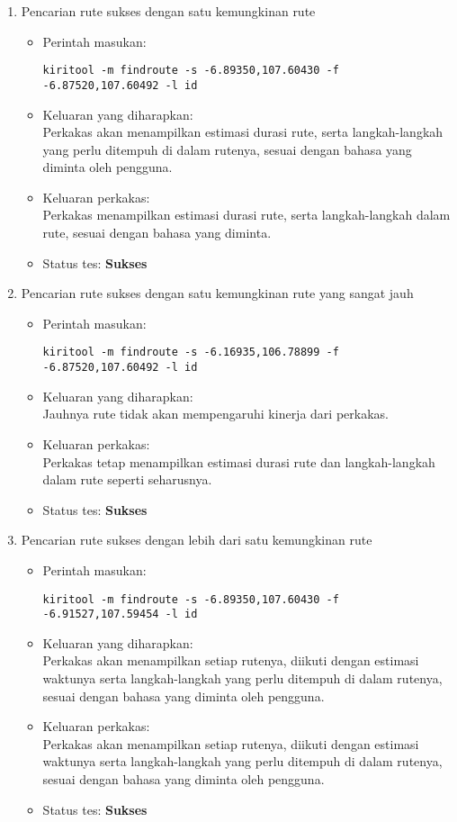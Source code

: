\begin{enumerate}
	\item Pencarian rute sukses dengan satu kemungkinan rute
	\begin{itemize}
		\item Perintah masukan:
		\begin{verbatim}
kiritool -m findroute -s -6.89350,107.60430 -f -6.87520,107.60492 -l id
		\end{verbatim}
		\item Keluaran yang diharapkan: \\
		Perkakas akan menampilkan estimasi durasi rute, serta langkah-langkah yang perlu ditempuh di dalam rutenya, sesuai dengan bahasa yang diminta oleh pengguna.
		\item Keluaran perkakas: \\
		Perkakas menampilkan estimasi durasi rute, serta langkah-langkah dalam rute, sesuai dengan bahasa yang diminta.
		\item Status tes: \textbf{Sukses}
	\end{itemize}
	
	\item Pencarian rute sukses dengan satu kemungkinan rute yang sangat jauh
	\begin{itemize}
		\item Perintah masukan:
		\begin{verbatim}
kiritool -m findroute -s -6.16935,106.78899 -f -6.87520,107.60492 -l id
		\end{verbatim}
		\item Keluaran yang diharapkan: \\
		Jauhnya rute tidak akan mempengaruhi kinerja dari perkakas.
		\item Keluaran perkakas: \\
		Perkakas tetap menampilkan estimasi durasi rute dan langkah-langkah dalam rute seperti seharusnya.
		\item Status tes: \textbf{Sukses}
	\end{itemize}
	
	\item Pencarian rute sukses dengan lebih dari satu kemungkinan rute
	\begin{itemize}
		\item Perintah masukan:
		\begin{verbatim}
kiritool -m findroute -s -6.89350,107.60430 -f -6.91527,107.59454 -l id
		\end{verbatim}
		\item Keluaran yang diharapkan: \\
		Perkakas akan menampilkan setiap rutenya, diikuti dengan estimasi waktunya serta langkah-langkah yang perlu ditempuh di dalam rutenya, sesuai dengan bahasa yang diminta oleh pengguna.
		\item Keluaran perkakas: \\
		Perkakas akan menampilkan setiap rutenya, diikuti dengan estimasi waktunya serta langkah-langkah yang perlu ditempuh di dalam rutenya, sesuai dengan bahasa yang diminta oleh pengguna.
		\item Status tes: \textbf{Sukses}
	\end{itemize}
	

\end{enumerate}
